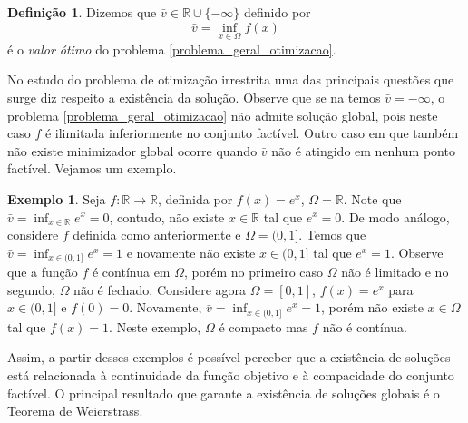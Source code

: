 \documentclass[12pt,a4paper]{scrartcl}
\def\RR{\mathds{R}}
\theoremstyle{definition}%
\newtheorem{exem}{Exemplo}
\newtheorem{defi}{Definição}
\begin{document}
\begin{defi} \label{defi:valor_otimo}
Dizemos que $\bar{v} \in \RR \cup \{ -\infty \}$ definido por
\[
\bar{v} = \inf_{x \in \Omega} f(x)
\]
é o \emph{valor ótimo} do problema \eqref{problema_geral_otimizacao}.
\end{defi}

No estudo do problema de otimização irrestrita uma das principais questões que surge diz respeito a existência da solução. Observe que se na  temos $\bar{v} = - \infty$, o problema \eqref{problema_geral_otimizacao} não admite solução global, pois neste caso $f$ é ilimitada inferiormente no conjunto factível. Outro caso em que também não existe minimizador global ocorre quando $\bar{v}$ não é atingido em nenhum ponto factível. Vejamos um exemplo.

\begin{exem}
Seja $f: \RR \rightarrow \RR$, definida por $f(x) = e^{x}$, $\Omega = \RR$. Note que $\bar{v} = \inf_{x \in \RR} e^{x} = 0$, contudo, não existe $x \in \RR$ tal que $e^{x} = 0$. 
De modo análogo, considere $f$ definida como anteriormente e $\Omega = (0,1]$. Temos que $\bar{v} = \inf_{x \in (0,1]} e^{x} = 1$ e novamente não existe $x \in (0,1]$ tal que $e^{x}=1$. Observe que a função $f$ é contínua em $\Omega$, porém no primeiro caso $\Omega$ não é limitado e no segundo, $\Omega$ não é fechado. 
Considere agora $\Omega = [0,1]$, $f(x)=e^{x}$ para $x \in (0,1]$ e $f(0)=0$. Novamente, $\bar{v} = \inf_{x \in (0,1]} e^{x} = 1$, porém não existe $x\in \Omega$ tal que $f(x)=1$. Neste exemplo, $\Omega$ é compacto mas $f$ não é contínua.
\end{exem}

Assim, a partir desses exemplos é possível perceber que a existência de soluções está relacionada à continuidade da função objetivo e à compacidade do conjunto factível. O principal resultado que garante a existência de soluções globais é o Teorema de Weierstrass.
\end{document}
